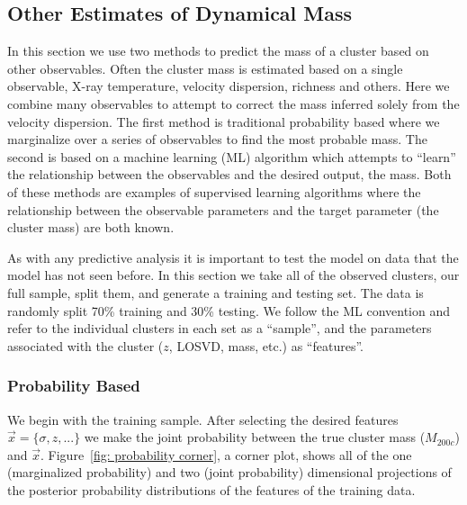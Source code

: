 \documentclass[fleqn,usenatbib]{mnras}
\begin{document}
\subsection{Other Estimates of Dynamical Mass}
In this section we use two methods to predict the mass of a cluster based on other observables. Often the cluster mass is estimated based on a single observable, X-ray temperature, velocity dispersion, richness and others. Here we combine many observables to attempt to correct the mass inferred solely from the velocity dispersion. The first method is traditional probability based where we marginalize over a series of observables to find the most probable mass. The second is based on a machine learning (ML) algorithm which attempts to ``learn'' the relationship between the observables and the desired output, the mass. Both of these methods are examples of supervised learning algorithms where the relationship between the observable parameters and the target parameter (the cluster mass) are both known.

As with any predictive analysis it is important to test the model on data that the model has not seen before. In this section we take all of the observed clusters, our full sample, split them, and generate a training and testing set. The data is randomly split 70\% training and 30\% testing. We follow the ML convention and refer to the individual clusters in each set as a ``sample'', and the parameters associated with the cluster ($z$, LOSVD, mass, etc.) as ``features''.

\subsubsection{Probability Based}\label{sec:probability method}
We begin with the training sample. After selecting the desired features $\vec{x} = \{\sigma, z, ...\}$ we make the joint probability between the true cluster mass ($M_{200c}$) and $\vec{x}$. Figure~\ref{fig: probability corner}, a corner plot, shows all of the one (marginalized probability) and two (joint probability) dimensional projections of the posterior probability distributions of the features of the training data.
\end{document}
